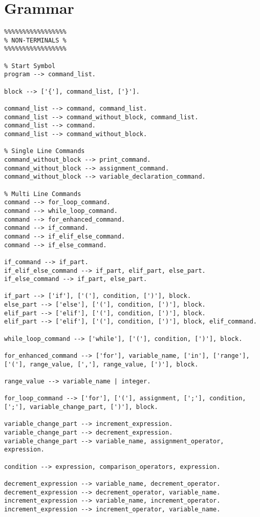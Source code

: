 \documentclass[12pt,letterpaper]{article}
\begin{document}
\section{Grammar}
\begin{verbatim}
%%%%%%%%%%%%%%%%%
% NON-TERMINALS %
%%%%%%%%%%%%%%%%%

% Start Symbol
program --> command_list.

block --> ['{'], command_list, ['}'].

command_list --> command, command_list.
command_list --> command_without_block, command_list.
command_list --> command.
command_list --> command_without_block.

% Single Line Commands
command_without_block --> print_command.
command_without_block --> assignment_command.
command_without_block --> variable_declaration_command.

% Multi Line Commands
command --> for_loop_command.
command --> while_loop_command.
command --> for_enhanced_command.
command --> if_command.
command --> if_elif_else_command.
command --> if_else_command.

if_command --> if_part.
if_elif_else_command --> if_part, elif_part, else_part.
if_else_command --> if_part, else_part.

if_part --> ['if'], ['('], condition, [')'], block.
else_part --> ['else'], ['('], condition, [')'], block.
elif_part --> ['elif'], ['('], condition, [')'], block.
elif_part --> ['elif'], ['('], condition, [')'], block, elif_command.

while_loop_command --> ['while'], ['('], condition, [')'], block.

for_enhanced_command --> ['for'], variable_name, ['in'], ['range'], ['('], range_value, [','], range_value, [')'], block.

range_value --> variable_name | integer.

for_loop_command --> ['for'], ['('], assignment, [';'], condition, [';'], variable_change_part, [')'], block.

variable_change_part --> increment_expression.
variable_change_part --> decrement_expression.
variable_change_part --> variable_name, assignment_operator, expression.

condition --> expression, comparison_operators, expression.

decrement_expression --> variable_name, decrement_operator.
decrement_expression --> decrement_operator, variable_name.
increment_expression --> variable_name, increment_operator.
increment_expression --> increment_operator, variable_name.


\end{verbatim}
\end{document}
